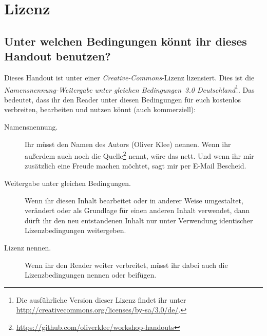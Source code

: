 \chapter{Lizenz}

\section*{Unter welchen Bedingungen könnt ihr dieses Handout benutzen?}
Dieses Handout ist unter einer \emph{Creative-Commons}-Lizenz lizensiert. Dies ist die \emph{Namensnennung-Weitergabe unter gleichen Bedingungen~3.0 Deutschland}\footnote{Die ausführliche Version dieser Lizenz findet ihr unter \url{http://creativecommons.org/licenses/by-sa/3.0/de/}.}. Das bedeutet, dass ihr den Reader unter diesen Bedingungen für euch kostenlos verbreiten, bearbeiten und nutzen könnt (auch kommerziell):
\begin{description}
  \item[Namensnennung.] Ihr müsst den Namen des Autors (Oliver Klee) nennen. Wenn ihr außerdem auch noch die Quelle\footnote{\url{https://github.com/oliverklee/workshop-handouts}} nennt, wäre das nett. Und wenn ihr mir zusätzlich eine Freude machen möchtet, sagt mir per E-Mail Bescheid.
  \item[Weitergabe unter gleichen Bedingungen.] Wenn ihr diesen Inhalt bearbeitet oder in anderer Weise umgestaltet, verändert oder als Grundlage für einen anderen Inhalt verwendet, dann dürft ihr den neu entstandenen Inhalt nur unter Verwendung identischer Lizenzbedingungen weitergeben.
  \item[Lizenz nennen.] Wenn ihr den Reader weiter verbreitet, müsst ihr dabei auch die Lizenzbedingungen nennen oder beifügen.
\end{description}
